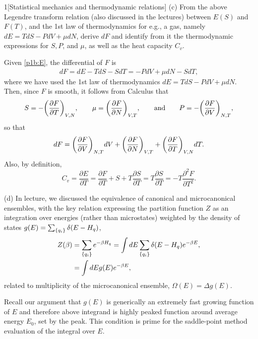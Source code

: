 \documentclass[12pt]{article}
\begin{document}
\begin{problem}{1}[Statistical mechanics and thermodynamic relations]
(c) From the above Legendre transform relation (also discussed in the lectures)
between $E(S)$ and $F(T)$, and the 1st law of thermodynamics for e.g., a gas,
namely $dE=TdS-PdV+\mu dN$, derive $dF$ and identify from it the thermodynamic
expressions for $S, P$, and $\mu$, as well as the heat capacity $C_v$.
\begin{solution}
    Given \eqref{p1b:E}, the differential of $F$ is
\begin{align}
    dF=dE-TdS-SdT=-PdV+\mu dN-SdT,
\end{align}
where we have used the 1st law of thermodynamics $dE=TdS-PdV+\mu dN$. Then,
since $F$ is smooth, it follows from Calculus that
\begin{equation}
    S=-\qty(\frac{\partial F}{\partial T})_{V,N},\qquad
    \mu=\qty(\frac{\partial F}{\partial N})_{V,T},\qquad\text{and}\qquad
    P=-\qty(\frac{\partial F}{\partial V})_{N,T},
\end{equation}
so that
\begin{equation}
    dF=\qty(\frac{\partial F}{\partial V})_{N,T}dV
    +\qty(\frac{\partial F}{\partial N})_{V,T}
    +\qty(\frac{\partial F}{\partial T})_{V,N}dT.
\end{equation}
Also, by definition,
\begin{equation}
    C_v=\frac{\partial E}{\partial T}
    =\frac{\partial F}{\partial T}+S+T\frac{\partial S}{\partial T}
    =T\frac{\partial S}{\partial T}=-T\frac{\partial^2F}{\partial T^2}.
\end{equation}
\end{solution}

(d) In lecture, we discussed the equivalence of canonical and microcanonical
ensembles, with the key relation expressing the partition function $Z$ as an
integration over energies (rather than microstates) weighted by the density of
states $g(E)=\sum_\qty{q_i}\delta(E-H_q)$,
\begin{align}
    Z(\beta)&=\sum_\qty{q_i}e^{-\beta H_q}=\int
    dE\sum_\qty{q_i}\delta(E-H_q)e^{-\beta E},\notag\\
    &=\int dEg(E)e^{-\beta E},
\end{align}
related to multiplicity of the microcanonical ensemble, $\Omega(E)=\Delta g(E)$.

Recall our argument that $g(E)$ is generically an extremely fast growing
function of $E$ and therefore above integrand is highly peaked function around
average energy $E_0$, set by the peak. This condition is prime for the
saddle-point method evaluation of the integral over $E$.


\end{problem}
\end{document}
